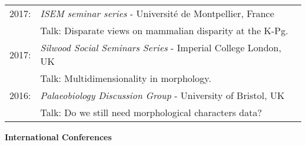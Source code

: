 \documentclass[10pt,a4paper]{article}
\begin{document}
{\begin{tabular}{ll}
2017: & \textit{ISEM seminar series} - Universit\'{e} de Montpellier, France\\
      & Talk: Disparate views on mammalian disparity at the K-Pg.\\ 
2017: & \textit{Silwood Social Seminars Series} - Imperial College London, UK\\
      & Talk: Multidimensionality in morphology.\\ 
2016: & \textit{Palaeobiology Discussion Group} - University of Bristol, UK\\
      & Talk: Do we still need morphological characters data?\\ 
\end{tabular}

\bigskip

\raggedright\textbf{International Conferences}\\[1.5ex]


}
\end{document}
